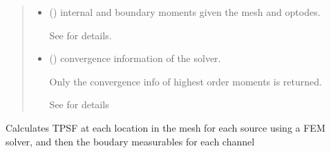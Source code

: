 \documentclass[letterpaper,10pt,english]{sphinxmanual}
\begin{document}
\begin{fulllineitems}
\begin{fulllineitems}
\begin{quote}
\begin{description}
\begin{itemize}
\end{itemize}

\sphinxAtStartPar
\begin{itemize}
\item {} 
\sphinxAtStartPar
{} () \textendash{} internal and boundary moments given the mesh and optodes.

\sphinxAtStartPar
See {\hyperref[\detokenize{_autosummary/nirfasterff.base.data.TRMomentsdata:nirfasterff.base.data.TRMomentsdata}]{}} for details.

\item {} 
\sphinxAtStartPar
{} () \textendash{} convergence information of the solver.

\sphinxAtStartPar
Only the convergence info of highest order moments is returned.

\sphinxAtStartPar
See {\hyperref[\detokenize{_autosummary/nirfasterff.utils.ConvergenceInfo:nirfasterff.utils.ConvergenceInfo}]{}} for details

\end{itemize}


\end{description}\end{quote}

\end{fulllineitems}


\begin{fulllineitems}
\label{\detokenize{_autosummary/nirfasterff.base.stnd_mesh.stndmesh:nirfasterff.base.stnd_mesh.stndmesh.femdata_tpsf}}
\pysigstartsignatures
{}
\pysigstopsignatures
\sphinxAtStartPar
Calculates TPSF at each location in the mesh for each source using a FEM solver, and then the boudary measurables for each channel


\end{fulllineitems}
\end{fulllineitems}
\end{document}
